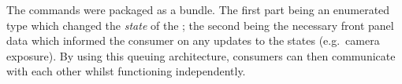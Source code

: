 The commands were packaged as a bundle.
The first part being an enumerated type which changed the \emph{state} of the ; the second being the necessary front panel data which informed the consumer on any updates to the states (e.g.\ camera exposure).
By using this queuing architecture, consumers can then communicate with each other whilst functioning independently.

%
%



